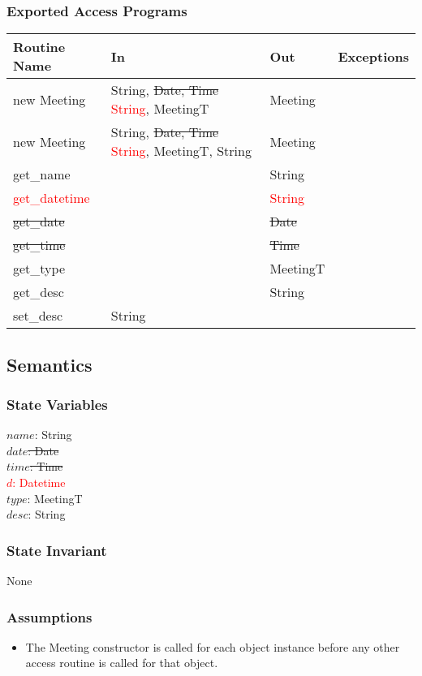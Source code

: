 \documentclass[12pt, titlepage]{article}
\begin{document}
\subsubsection* {Exported Access Programs}
\begin{tabular}{|l|l|l|l|}
    \hline
    \textbf{Routine Name} & \textbf{In} & \textbf{Out} & \textbf{Exceptions} \\
    \hline
    new Meeting & String, \sout{Date, Time} \textcolor{red}{String}, MeetingT & Meeting & \\
    \hline
    new Meeting & String, \sout{Date, Time} \textcolor{red}{String}, MeetingT, String & Meeting & \\
    \hline
    get\_name & & String &\\
    \hline
    \textcolor{red}{get\_datetime} & & \textcolor{red}{String} &\\
    \hline
    {\sout{get\_date}} & & {\sout{Date}}&\\
    \hline
    {\sout{get\_time}} & & {\sout{Time}}&\\
    \hline
    get\_type & & MeetingT &\\
    \hline
    get\_desc & & String &\\
    \hline
    set\_desc & String & & \\
    \hline
\end{tabular}

\subsection* {Semantics}
\subsubsection* {State Variables}
$name$: String\\
{\sout{$date$: Date}}\\
{\sout{$time$: Time}}\\
\textcolor{red}{$d$: Datetime}\\
$type$: MeetingT\\
$desc$: String

\subsubsection* {State Invariant}
None

\subsubsection* {Assumptions}
\begin{itemize}
  \item The Meeting constructor is called for each object instance before any other access routine is called for that object.
\end{itemize}
\end{document}
